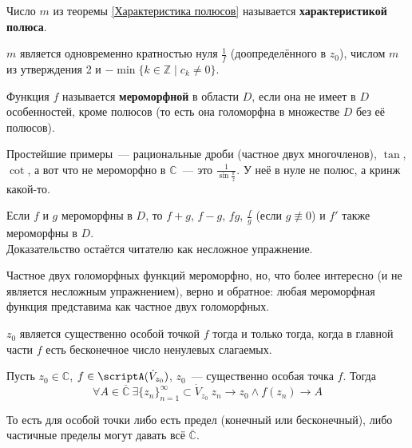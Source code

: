 \documentclass{article}
\begin{document}
    \begin{definition}
        Число $m$ из теоремы \ref{Характеристика полюсов} называется \textbf{характеристикой полюса}.
    \end{definition}
    \begin{remark}
        $m$ является одновременно кратностью нуля $\frac1f$ (доопределённого в $z_0$), числом $m$ из утверждения 2 и $-\min\{k\in\mathbb Z\mid c_k\neq0\}$.
    \end{remark}
    \begin{definition}
        Функция $f$ называется \textbf{мероморфной} в области $D$, если она не имеет в $D$ особенностей, кроме полюсов (то есть она голоморфна в множестве $D$ без её полюсов).
    \end{definition}
    \begin{example}
        Простейшие примеры~--- рациональные дроби (частное двух многочленов), $\tan$, $\cot$, а вот что не мероморфно в $\mathbb C$~--- это $\frac1{\sin\frac\pi z}$. У неё в нуле не полюс, а кринж какой-то.
    \end{example}
    \begin{property}
        Если $f$ и $g$ мероморфны в $D$, то $f+g$, $f-g$, $fg$, $\frac fg$ (если $g\not\equiv0$) и $f'$ также мероморфны в $D$.\\
        Доказательство остаётся читателю как несложное упражнение.
    \end{property}
    \begin{claim}
        Частное двух голоморфных функций мероморфно, но, что более интересно (и не является несложным упражнением), верно и обратное: любая мероморфная функция представима как частное двух голоморфных.
    \end{claim}
    \begin{corollary}
        $z_0$ является существенно особой точкой $f$ тогда и только тогда, когда в главной части $f$ есть бесконечное число ненулевых слагаемых.
    \end{corollary}
    \begin{theorem}
        Пусть $z_0\in\mathbb C$, $f\in\scriptA(\dot V_{z_0})$, $z_0$~--- существенно особая точка $f$. Тогда
        $$
        \forall A\in\overline{\mathbb C}~\exists\{z_n\}_{n=1}^\infty\subset\dot V_{z_0}~z_n\to z_0\land f(z_n)\to A
        $$
    \end{theorem}
    \begin{remark}
        То есть для особой точки либо есть предел (конечный или бесконечный), либо частичные пределы могут давать всё $\overline{\mathbb C}$.
    \end{remark}
\end{document}
